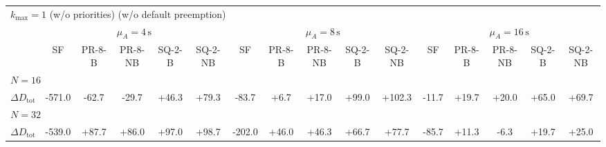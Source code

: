 \begin{tabular}{l c c c c c c c c c c c c c c c}
\toprule
\multicolumn{16}{l}{$k_{\max}=1$ (w/o priorities) (w/o default preemption)} \\
\addlinespace[0.2em]
 & \multicolumn{5}{c}{$\mu_A=4\,\mathrm{s}$} & \multicolumn{5}{c}{$\mu_A=8\,\mathrm{s}$} & \multicolumn{5}{c}{$\mu_A=16\,\mathrm{s}$} \\
\cmidrule(lr){2-6}\cmidrule(lr){7-11}\cmidrule(lr){12-16}
 & SF & PR-8-B & PR-8-NB & SQ-2-B & SQ-2-NB & SF & PR-8-B & PR-8-NB & SQ-2-B & SQ-2-NB & SF & PR-8-B & PR-8-NB & SQ-2-B & SQ-2-NB \\
\midrule
\multicolumn{16}{l}{${N=16}$} \\
\midrule
$\Delta D_{\mathrm{tot}}$ & -571.0 & -62.7 & -29.7 & +46.3 & +79.3 & -83.7 & +6.7 & +17.0 & +99.0 & +102.3 & -11.7 & +19.7 & +20.0 & +65.0 & +69.7 \\
\midrule
\multicolumn{16}{l}{${N=32}$} \\
\midrule
$\Delta D_{\mathrm{tot}}$ & -539.0 & +87.7 & +86.0 & +97.0 & +98.7 & -202.0 & +46.0 & +46.3 & +66.7 & +77.7 & -85.7 & +11.3 & -6.3 & +19.7 & +25.0 \\
\bottomrule
\end{tabular}

